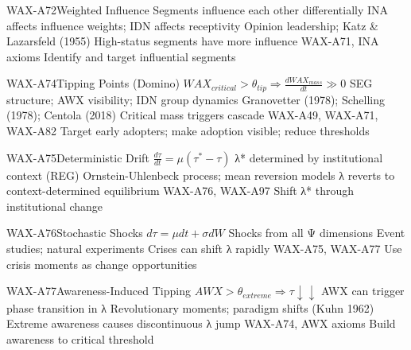 \begin{axiomspec}{WAX-A72}{Weighted Influence}
 Segments influence each other differentially
 INA affects influence weights; IDN affects receptivity
 Opinion leadership; Katz \& Lazarsfeld (1955)
 High-status segments have more influence
 WAX-A71, INA axioms
 Identify and target influential segments
\end{axiomspec}

\begin{axiomspec}{WAX-A74}{Tipping Points (Domino)}
 $WAX_{critical} > \theta_{tip} \Rightarrow \frac{dWAX_{mass}}{dt} \gg 0$
 SEG structure; AWX visibility; IDN group dynamics
 Granovetter (1978); Schelling (1978); Centola (2018)
 Critical mass triggers cascade
 WAX-A49, WAX-A71, WAX-A82
 Target early adopters; make adoption visible; reduce thresholds
\end{axiomspec}


\begin{axiomspec}{WAX-A75}{Deterministic Drift}
 $\frac{d\tau}{dt} = \mu(\tau^* - \tau)$
 λ* determined by institutional context (REG)
 Ornstein-Uhlenbeck process; mean reversion models
 λ reverts to context-determined equilibrium
 WAX-A76, WAX-A97
 Shift λ* through institutional change
\end{axiomspec}

\begin{axiomspec}{WAX-A76}{Stochastic Shocks}
 $d\tau = \mu dt + \sigma dW$
 Shocks from all Ψ dimensions
 Event studies; natural experiments
 Crises can shift λ rapidly
 WAX-A75, WAX-A77
 Use crisis moments as change opportunities
\end{axiomspec}

\begin{axiomspec}{WAX-A77}{Awareness-Induced Tipping}
 $AWX > \theta_{extreme} \Rightarrow \tau \downarrow\downarrow$
 AWX can trigger phase transition in λ
 Revolutionary moments; paradigm shifts (Kuhn 1962)
 Extreme awareness causes discontinuous λ jump
 WAX-A74, AWX axioms
 Build awareness to critical threshold
\end{axiomspec}

